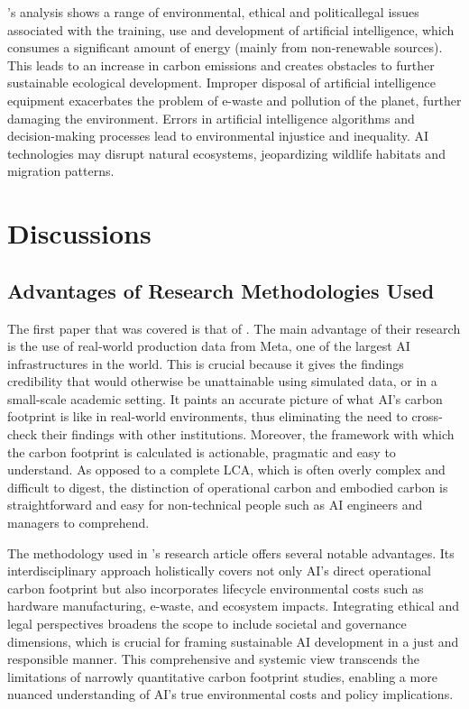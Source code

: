 \documentclass[a4paper, 12pt]{article}
\begin{document}
\hspace{24pt} \citet{Zhuk2023}'s analysis shows a range of environmental, ethical and politicallegal issues associated with the training, use and development of artificial intelligence, which consumes a significant amount of energy (mainly from non-renewable sources). This leads to an increase in carbon emissions and creates obstacles to further sustainable ecological development. Improper disposal of artificial intelligence equipment exacerbates the problem of e-waste and pollution of the planet, further damaging the environment. Errors in artificial intelligence algorithms and decision-making processes
lead to environmental injustice and inequality. AI technologies may disrupt
natural ecosystems, jeopardizing wildlife habitats and migration patterns.

\section{Discussions}
\subsection{Advantages of Research Methodologies Used}
\hspace{24pt}The first paper that was covered is that of \citet{Wu2022}. The main advantage of their research is the use of real-world production data from Meta, one of the largest AI infrastructures in the world. This is crucial because it gives the findings credibility that would otherwise be unattainable using simulated data, or in a small-scale academic setting. It paints an accurate picture of what AI's carbon footprint is like in real-world environments, thus eliminating the need to cross-check their findings with other institutions. Moreover, the framework with which the carbon footprint is calculated is actionable, pragmatic and easy to understand. As opposed to a complete LCA, which is often overly complex and difficult to digest, the distinction of operational carbon and embodied carbon is straightforward and easy for non-technical people such as AI engineers and managers to comprehend.

\hspace{24pt} The methodology used in \citet{Zhuk2023}'s research article offers several notable advantages. Its interdisciplinary approach holistically covers not only AI's direct operational carbon footprint but also incorporates lifecycle environmental costs such as hardware manufacturing, e-waste, and ecosystem impacts. Integrating ethical and legal perspectives broadens the scope to include societal and governance dimensions, which is crucial for framing sustainable AI development in a just and responsible manner. This comprehensive and systemic view transcends the limitations of narrowly quantitative carbon footprint studies, enabling a more nuanced understanding of AI's true environmental costs and policy implications.
\end{document}
